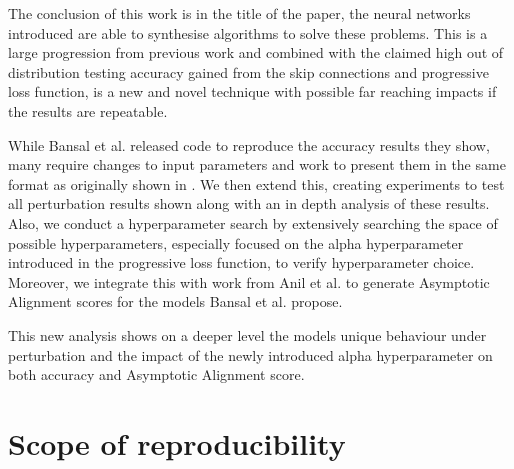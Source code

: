 The conclusion of this work is in the title of the paper, the neural networks introduced are able to synthesise algorithms to solve these problems. This is a large progression from previous work and combined with the claimed high out of distribution testing accuracy gained from the skip connections and progressive loss function, is a new and novel technique with possible far reaching impacts if the results are repeatable. 

While Bansal et al. released code to reproduce the accuracy results they show, many require changes to input parameters and work to present them in the same format as originally shown in \cite{bansal2022endtoend}. We then extend this, creating experiments to test all perturbation results shown along with an in depth analysis of these results. Also, we conduct a hyperparameter search by extensively searching the space of possible hyperparameters, especially focused on the alpha hyperparameter introduced in the progressive loss function, to verify hyperparameter choice. Moreover, we integrate this with work from Anil et al. \cite{anil2022path} to generate Asymptotic Alignment scores for the models Bansal et al. propose.

This new analysis shows on a deeper level the models unique behaviour under perturbation and the impact of the newly introduced alpha hyperparameter on both accuracy and Asymptotic Alignment score.

\section{Scope of reproducibility}
\label{sec:claims}



